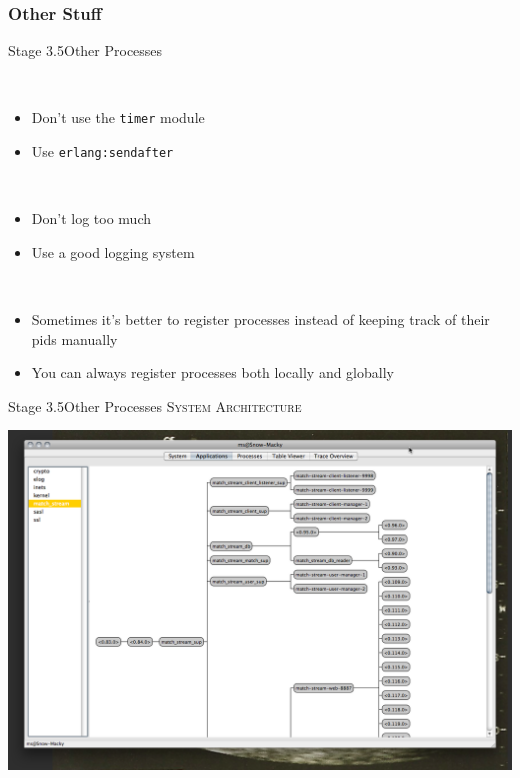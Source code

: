 \documentclass[utf8]{beamer}
\begin{document}
\subsubsection{Other Stuff}
\begin{frame}{Stage 3.5}{Other Processes}
	\begin{description}
		\item<+->[Timers]\ \\
			\begin{itemize}
				\item Don't use the \texttt{timer} module
				\item Use \texttt{erlang:send\textunderscore after}
			\end{itemize}
		\item<+->[Logging]\ \\
			\begin{itemize}
				\item Don't log too much
				\item Use a good logging system
			\end{itemize}
		\item<+->[Registration]\ \\
			\begin{itemize}
				\item Sometimes it's better to register processes instead of keeping track of their pids manually
				\item You can always register processes \alert{both} locally and globally
			\end{itemize}
	\end{description}
\end{frame}
\begin{frame}{Stage 3.5}{Other Processes}
	\textsc{System Architecture}
	\begin{center}
		\includegraphics[height=.75\textheight]{img/running-late.png}
	\end{center}
\end{frame}
\end{document}
